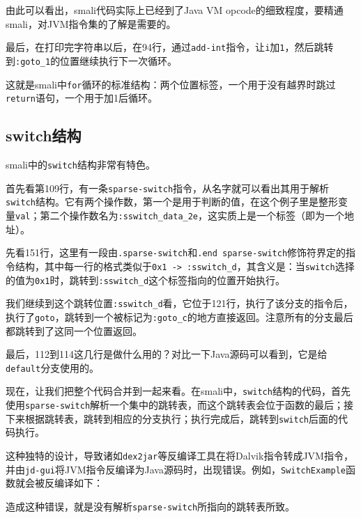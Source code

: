 由此可以看出，smali代码实际上已经到了Java VM opcode的细致程度，要精通smali，对JVM指令集的了解是需要的。

最后，在打印完字符串以后，在94行，通过\lstinline!add-int!指令，让\lstinline!i!加\lstinline!1!，然后跳转到\lstinline!:goto_1!的位置继续执行下一次循环。

这就是smali中\lstinline!for!循环的标准结构：两个位置标签，一个用于没有越界时跳过\lstinline!return!语句，一个用于加1后循环。

\subsection{switch结构}
\label{SubSec:dalvik-smali-switch}




smali中的\lstinline!switch!结构非常有特色。

首先看第109行，有一条\lstinline!sparse-switch!指令，从名字就可以看出其用于解析\lstinline!switch!结构。它有两个操作数，第一个是用于判断的值，在这个例子里是整形变量\lstinline!val!；第二个操作数名为\lstinline!:sswitch_data_2e!，这实质上是一个标签（即为一个地址）。

先看151行，这里有一段由\lstinline!.sparse-switch!和\lstinline!.end sparse-switch!修饰符界定的指令结构，其中每一行的格式类似于\lstinline!0x1 -> :sswitch_d!，其含义是：当\lstinline!switch!选择的值为\lstinline!0x1!时，跳转到\lstinline!:sswitch_d!这个标签指向的位置开始执行。

我们继续到这个跳转位置\lstinline!:sswitch_d!看，它位于121行，执行了该分支的指令后，执行了\lstinline!goto!，跳转到一个被标记为\lstinline!:goto_c!的地方直接返回。注意所有的分支最后都跳转到了这同一个位置返回。

最后，112到114这几行是做什么用的？对比一下Java源码可以看到，它是给\lstinline!default!分支使用的。

现在，让我们把整个代码合并到一起来看。在smali中，\lstinline!switch!结构的代码，首先使用\lstinline!sparse-switch!解析一个集中的跳转表，而这个跳转表会位于函数的最后；接下来根据跳转表，跳转到相应的分支执行；执行完成后，跳转到\lstinline!switch!后面的代码执行。

这种独特的设计，导致诸如\lstinline!dex2jar!等反编译工具在将Dalvik指令转成JVM指令，并由\lstinline!jd-gui!将JVM指令反编译为Java源码时，出现错误。例如，\lstinline!SwitchExample!函数就会被反编译如下：

造成这种错误，就是没有解析\lstinline!sparse-switch!所指向的跳转表所致。

